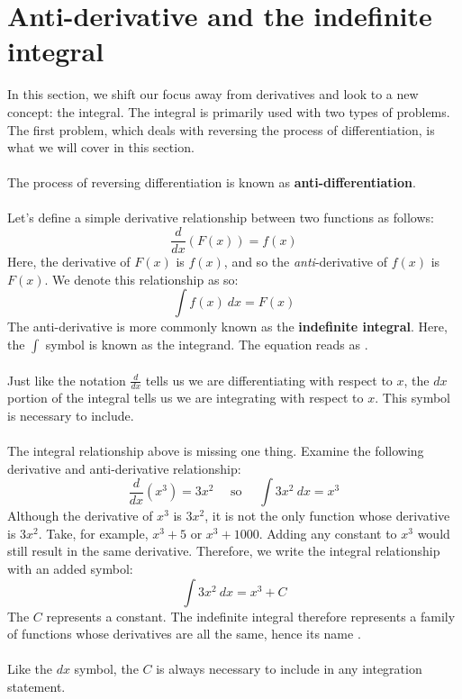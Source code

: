 \documentclass[11pt]{scrartcl}
\begin{document}
\maketitle
\noindent 

\section{Anti-derivative and the indefinite integral}
\noindent
In this section, we shift our focus away from derivatives and look to a new concept: the integral. The integral is primarily used with two types of problems. The first problem, which deals with reversing the process of differentiation, is what we will cover in this section. \\
\\
\noindent 
The process of reversing differentiation is known as \textbf{anti-differentiation}. \\ 
\\
\noindent 
Let's define a simple derivative relationship between two functions as follows: 
$$\frac{d}{dx}(F(x))=f(x)$$
\noindent 
Here, the derivative of $F(x)$ is $f(x)$, and so the \textit{anti}-derivative of $f(x)$ is $F(x)$. We denote this relationship as so: 
$$\int{f(x) \ dx}=F(x)$$
\noindent 
The anti-derivative is more commonly known as the \textbf{indefinite integral}. Here, the $\int$ symbol is known as the integrand. The equation reads as . \\
\\
\noindent 
Just like the notation $\frac{d}{dx}$ tells us we are differentiating with respect to $x$, the $dx$ portion of the integral tells us we are integrating with respect to $x$. This symbol is necessary to include. \\
\\
\noindent 
The integral relationship above is missing one thing. Examine the following derivative and anti-derivative relationship: 
$$\frac{d}{dx}(x^3)=3x^2 \ \ \ \ \ \ \text{so} \ \ \ \ \ \ \int{3x^2 \ dx}=x^3$$
\noindent 
Although the derivative of $x^3$ is $3x^2$, it is not the only function whose derivative is $3x^2$. Take, for example, $x^3+5$ or $x^3+1000$. Adding any constant to $x^3$ would still result in the same derivative. Therefore, we write the integral relationship with an added symbol: 
$$\int{3x^2 \ dx}=x^3+C$$
\noindent 
The $C$ represents a constant. The indefinite integral therefore represents a family of functions whose derivatives are all the same, hence its name . \\
\\
\noindent 
Like the $dx$ symbol, the $C$ is always necessary to include in any integration statement. 
\end{document}

